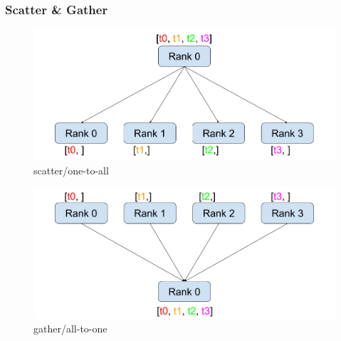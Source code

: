 \documentclass{beamer}
\begin{document}
\begin{frame}[fragile]
\frametitle{Scatter \& Gather}

\begin{figure}[h]
    \centering
    \includegraphics[height=0.3\textheight]{scatter.png}
    \captionsetup{labelformat=empty}
    \caption{scatter/one-to-all}
\end{figure}

\begin{figure}[h]
    \centering
    \includegraphics[height=0.3\textheight]{gather.png}
    \captionsetup{labelformat=empty}
    \caption{gather/all-to-one}
\end{figure}

\end{frame}
\end{document}
